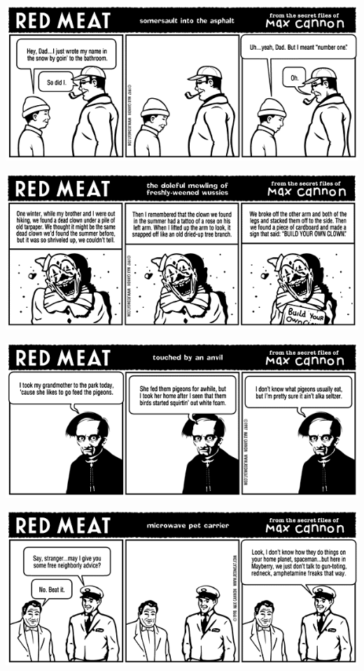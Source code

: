 \documentclass[a4paper,twoside,11pt]{article}
\begin{document}
\includegraphics[width=\textwidth]{redmeat_1998-03-16.png}



\includegraphics[width=\textwidth]{redmeat_1998-03-23.png}



\includegraphics[width=\textwidth]{redmeat_1998-03-30.png}



\includegraphics[width=\textwidth]{redmeat_1998-04-06.png}
\end{document}
